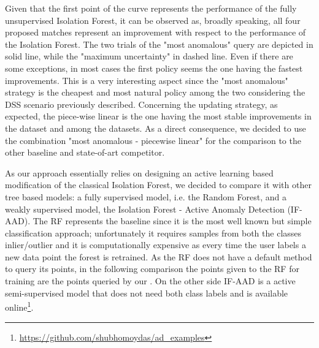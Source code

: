 Given that the first point of the curve represents the performance of the fully unsupervised Isolation Forest, it can be observed as, broadly speaking, all four proposed matches represent an improvement with respect to the performance of the Isolation Forest. The two trials of the "most anomalous" query are depicted in solid line, while the "maximum uncertainty" in dashed line. Even if there are some exceptions, in most cases the first policy seems the one having the fastest improvements. This is a very interesting aspect since the "most anomalous" strategy is the cheapest and most natural policy among the two considering the DSS scenario previously described. Concerning the updating strategy, as expected, the piece-wise linear is the one having the most stable improvements in the dataset and among the datasets. As a direct consequence, we decided to use the combination "most anomalous - piecewise linear" for the comparison to the other baseline and state-of-art competitor.

As our approach \approach essentially relies on designing an active learning based modification of the classical Isolation Forest, we decided to compare it with other tree based models: a fully supervised model, i.e. the Random Forest, and a weakly supervised model, the Isolation Forest - Active Anomaly Detection (IF-AAD).
The RF represents the baseline since it is the most well known but simple classification approach; unfortunately it requires samples from both the classes inlier/outlier and it is computationally expensive as every time the user labels a new data point the forest is retrained. As the RF does not have a default method to query its points, in the following comparison the points given to the RF for training are the points queried by our \approach.
On the other side IF-AAD is a active semi-supervised model  that does not need both class labels and is available online\footnote{\url{https://github.com/shubhomoydas/ad_examples}}. 

